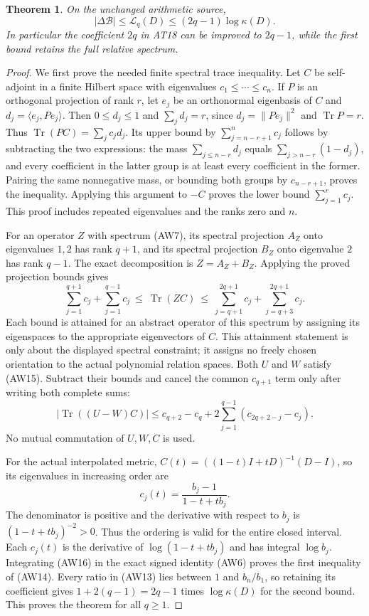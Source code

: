 \documentclass[11pt,a4paper]{article}
\newtheorem{theorem}{Theorem}[section]
\DeclareMathOperator{\Tr}{Tr}
\begin{document}
\begin{theorem}
On the unchanged arithmetic source,
\[
 |\Delta\mathcal B|\le\mathcal L_q(D)
                  \le(2q-1)\log\kappa(D).
 \tag{AW14}
\]
In particular the coefficient $2q$ in AT18 can be improved to
$2q-1$, while the first bound retains the full relative spectrum.
\end{theorem}
\begin{proof}
We first prove the needed finite spectral trace inequality.
Let $C$ be self-adjoint in a finite Hilbert space with eigenvalues
$c_1\le\cdots\le c_n$. If $P$ is an orthogonal projection of
rank $r$, let $e_j$ be an orthonormal eigenbasis of $C$ and
$d_j=\langle e_j,Pe_j\rangle$. Then $0\le d_j\le1$ and
$\sum_jd_j=r$, since $d_j=\|Pe_j\|^2$ and $\Tr P=r$.
Thus $\Tr(PC)=\sum_jc_jd_j$.
Its upper bound by $\sum_{j=n-r+1}^n c_j$ follows by subtracting
the two expressions: the mass $\sum_{j\le n-r}d_j$ equals
$\sum_{j>n-r}(1-d_j)$, and every coefficient in the latter
group is at least every coefficient in the former. Pairing the
same nonnegative mass, or bounding both groups by $c_{n-r+1}$,
proves the inequality. Applying this argument to $-C$ proves
the lower bound $\sum_{j=1}^r c_j$. This proof includes repeated
eigenvalues and the ranks zero and $n$.

For an operator $Z$ with spectrum (AW7), its spectral projection
$A_Z$ onto eigenvalues $1,2$ has rank $q+1$, and its spectral
projection $B_Z$ onto eigenvalue $2$ has rank $q-1$.
The exact decomposition is $Z=A_Z+B_Z$. Applying the proved
projection bounds gives
\[
 \sum_{j=1}^{q+1}c_j+\sum_{j=1}^{q-1}c_j
 \ \le\ \Tr(ZC)\ \le\
 \sum_{j=q+1}^{2q+1}c_j+\sum_{j=q+3}^{2q+1}c_j.
 \tag{AW15}
\]
Each bound is attained for an abstract operator of this spectrum
by assigning its eigenspaces to the appropriate eigenvectors
of $C$. This attainment statement is only about the displayed
spectral constraint; it assigns no freely chosen orientation
to the actual polynomial relation spaces.
Both $U$ and $W$ satisfy (AW15). Subtract their bounds and cancel
the common $c_{q+1}$ term only after writing both complete sums:
\[
 |\Tr((U-W)C)|
 \le c_{q+2}-c_q
       +2\sum_{j=1}^{q-1}(c_{2q+2-j}-c_j).
 \tag{AW16}
\]
No mutual commutation of $U,W,C$ is used.

For the actual interpolated metric,
$C(t)=((1-t)I+tD)^{-1}(D-I)$, so its eigenvalues in increasing
order are
\[
 c_j(t)=\frac{b_j-1}{1-t+tb_j}.
 \tag{AW17}
\]
The denominator is positive and the derivative with respect
to $b_j$ is $(1-t+tb_j)^{-2}>0$. Thus the ordering is valid
for the entire closed interval. Each $c_j(t)$ is the derivative
of $\log(1-t+tb_j)$ and has integral $\log b_j$.
Integrating (AW16) in the exact signed identity (AW6) proves
the first inequality of (AW14). Every ratio in (AW13) lies
between $1$ and $b_n/b_1$, so retaining its coefficient gives
$1+2(q-1)=2q-1$ times $\log\kappa(D)$ for the second bound.
This proves the theorem for all $q\ge1$.
\end{proof}
\end{document}
